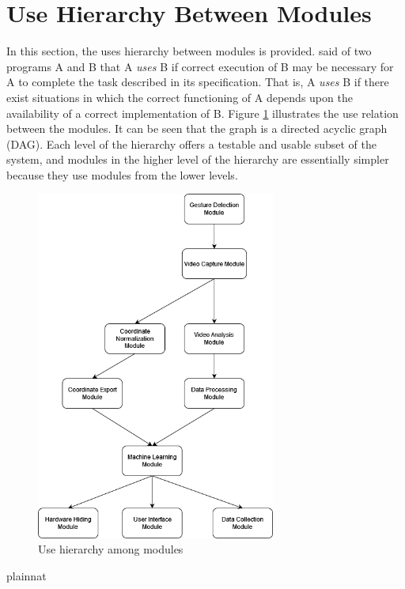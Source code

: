 \documentclass[12pt, titlepage]{article}
\begin{document}
\section{Use Hierarchy Between Modules} \label{SecUse}

In this section, the uses hierarchy between modules is
provided. \citet{Parnas1978} said of two programs A and B that A {\em uses} B if
correct execution of B may be necessary for A to complete the task described in
its specification. That is, A {\em uses} B if there exist situations in which
the correct functioning of A depends upon the availability of a correct
implementation of B.  Figure \ref{FigUH} illustrates the use relation between
the modules. It can be seen that the graph is a directed acyclic graph
(DAG). Each level of the hierarchy offers a testable and usable subset of the
system, and modules in the higher level of the hierarchy are essentially simpler
because they use modules from the lower levels.

\begin{figure}[H]
\centering
\includegraphics[width=0.7\textwidth]{Hierarchy.png}
\caption{Use hierarchy among modules}
\label{FigUH}
\end{figure}


 {plainnat}

\end{document}
